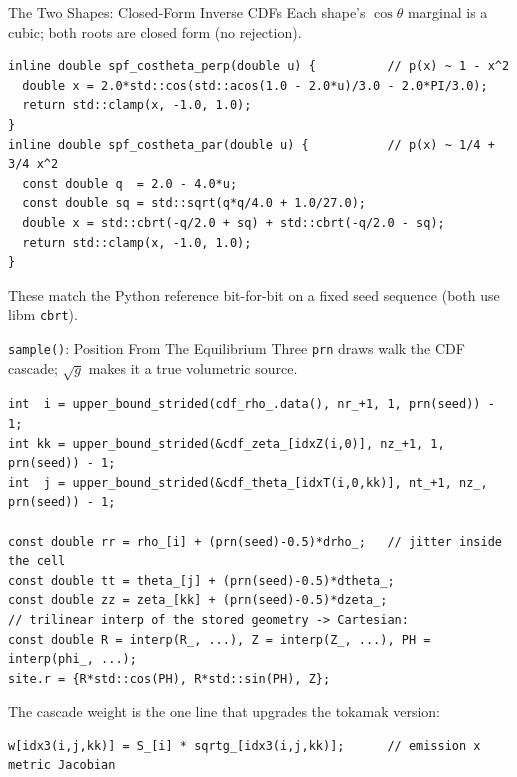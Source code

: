 \documentclass[11pt,aspectratio=169]{beamer}
\begin{document}
\begin{frame}[fragile]{The Two Shapes: Closed-Form Inverse CDFs}
Each shape's $\cos\theta$ marginal is a cubic; both roots are closed form (no rejection).
\begin{verbatim}
inline double spf_costheta_perp(double u) {          // p(x) ~ 1 - x^2
  double x = 2.0*std::cos(std::acos(1.0 - 2.0*u)/3.0 - 2.0*PI/3.0);
  return std::clamp(x, -1.0, 1.0);
}
inline double spf_costheta_par(double u) {           // p(x) ~ 1/4 + 3/4 x^2
  const double q  = 2.0 - 4.0*u;
  const double sq = std::sqrt(q*q/4.0 + 1.0/27.0);
  double x = std::cbrt(-q/2.0 + sq) + std::cbrt(-q/2.0 - sq);
  return std::clamp(x, -1.0, 1.0);
}
\end{verbatim}
\footnotesize These match the Python reference bit-for-bit on a fixed seed sequence
(both use libm \texttt{cbrt}).
\end{frame}

\begin{frame}[fragile]{\texttt{sample()}: Position From The Equilibrium}
Three \texttt{prn} draws walk the CDF cascade; $\sqrt{g}$ makes it a true volumetric source.
\begin{verbatim}
int  i = upper_bound_strided(cdf_rho_.data(), nr_+1, 1, prn(seed)) - 1;
int kk = upper_bound_strided(&cdf_zeta_[idxZ(i,0)], nz_+1, 1, prn(seed)) - 1;
int  j = upper_bound_strided(&cdf_theta_[idxT(i,0,kk)], nt_+1, nz_, prn(seed)) - 1;

const double rr = rho_[i] + (prn(seed)-0.5)*drho_;   // jitter inside the cell
const double tt = theta_[j] + (prn(seed)-0.5)*dtheta_;
const double zz = zeta_[kk] + (prn(seed)-0.5)*dzeta_;
// trilinear interp of the stored geometry -> Cartesian:
const double R = interp(R_, ...), Z = interp(Z_, ...), PH = interp(phi_, ...);
site.r = {R*std::cos(PH), R*std::sin(PH), Z};
\end{verbatim}
The cascade weight is the one line that upgrades the tokamak version:
\begin{verbatim}
w[idx3(i,j,kk)] = S_[i] * sqrtg_[idx3(i,j,kk)];      // emission x metric Jacobian
\end{verbatim}
\end{frame}
\end{document}
